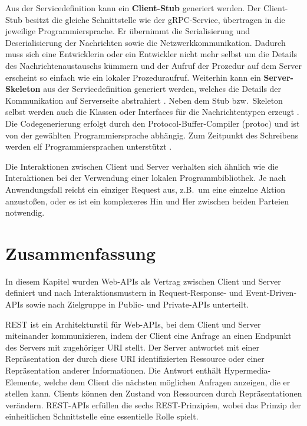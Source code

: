 Aus der Servicedefinition kann ein \textbf{Client-Stub} generiert werden. Der Client-Stub besitzt die gleiche Schnittstelle wie der gRPC-Service, übertragen in die jeweilige Programmiersprache. Er übernimmt die Serialisierung und Deserialisierung der Nachrichten sowie die Netzwerkkommunikation. Dadurch muss sich eine Entwicklerin oder ein Entwickler nicht mehr selbst um die Details des Nachrichtenaustauschs kümmern und der Aufruf der Prozedur auf dem Server erscheint so einfach wie ein lokaler Prozeduraufruf. Weiterhin kann ein \textbf{Server-Skeleton} aus der Servicedefinition generiert werden, welches die Details der Kommunikation auf Serverseite abstrahiert \autocite[S.~2f.]{Indrasiri2020}. Neben dem Stub bzw.\ Skeleton selbst werden auch die Klassen oder Interfaces für die Nachrichtentypen erzeugt \autocite[S.~25]{Indrasiri2020}. Die Codegenerierung erfolgt durch den Protocol-Buffer-Compiler (protoc) und ist von der gewählten Programmiersprache abhängig. Zum Zeitpunkt des Schreibens werden elf Programmiersprachen unterstützt \autocite{gRPC_Languages}.

Die Interaktionen zwischen Client und Server verhalten sich ähnlich wie die Interaktionen bei der Verwendung einer lokalen Programmbibliothek. Je nach Anwendungsfall reicht ein einziger Request aus, z.B.\ um eine einzelne Aktion anzustoßen, oder es ist ein komplexeres Hin und Her zwischen beiden Parteien notwendig.

\section{Zusammenfassung}

In diesem Kapitel wurden Web-APIs als Vertrag zwischen Client und Server definiert und nach Interaktionsmustern in Request-Response- und Event-Driven-APIs sowie nach Zielgruppe in Public- und Private-APIs unterteilt.

REST ist ein Architekturstil für Web-APIs, bei dem Client und Server miteinander kommunizieren, indem der Client eine Anfrage an einen Endpunkt des Servers mit zugehöriger URI stellt. Der Server antwortet mit einer Repräsentation der durch diese URI identifizierten Ressource oder einer Repräsentation anderer Informationen. Die Antwort enthält Hypermedia-Elemente, welche dem Client die nächsten möglichen Anfragen anzeigen, die er stellen kann. Clients können den Zustand von Ressourcen durch Repräsentationen verändern. REST-APIs erfüllen die sechs REST-Prinzipien, wobei das Prinzip der einheitlichen Schnittstelle eine essentielle Rolle spielt.

